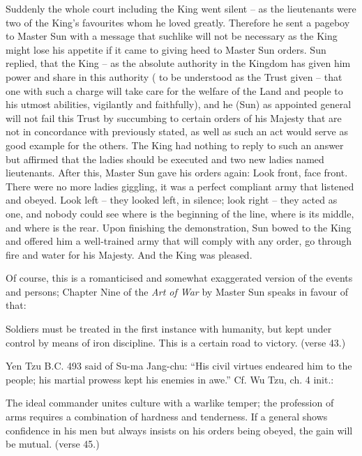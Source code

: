 Suddenly the whole court including the King went silent -- as the lieutenants were two of the King's favourites whom he loved greatly. Therefore he sent a pageboy to Master Sun with a message that suchlike will not be necessary as the King might lose his appetite if it came to giving heed to Master Sun orders. Sun replied, that the King -- as the absolute authority in the Kingdom has given him power and share in this authority ( to be understood as the Trust given -- that one with such a charge will take care for the welfare of the Land and people to his utmost abilities, vigilantly and faithfully), and he (Sun) as appointed general will not fail this Trust by succumbing to certain orders of his Majesty that are not in concordance with previously stated, as well as such an act would serve as good example for the others. The King had nothing to reply to such an answer but affirmed that the ladies should be executed and two new ladies named lieutenants. After this, Master Sun gave his orders again: Look front, face front. There were no more ladies giggling, it was a perfect compliant army that listened and obeyed. Look left -- they looked left, in silence; look right -- they acted as one, and nobody could see where is the beginning of the line, where is its middle, and where is the rear. Upon finishing the demonstration, Sun bowed to the King and offered him a well-trained army that will comply with any order, go through fire and water for his Majesty. And the King was pleased.

Of course, this is a romanticised and somewhat exaggerated version of the events and persons; Chapter Nine of the \emph{Art of War} by Master Sun speaks in favour of that:

\begin{quotex}
Soldiers must be treated in the first instance with humanity, but kept under control by means of iron discipline. This is a certain road to victory. (verse 43.)
\end{quotex}


Yen Tzu B.C. 493 said of Su-ma Jang-chu: ``His civil virtues endeared him to the people; his martial prowess kept his enemies in awe.'' Cf. Wu Tzu, ch. 4 init.:

\begin{quotex}
The ideal commander unites culture with a warlike temper; the profession of arms requires a combination of hardness and tenderness. If a general shows confidence in his men but always insists on his orders being obeyed, the gain will be mutual. (verse 45.)
\end{quotex}



